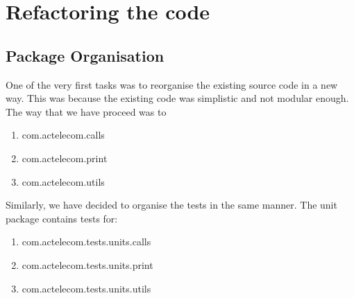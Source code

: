 \documentclass[11pt,twocolumn]{article} %
\begin{document}
\section{Refactoring the code}

\subsection{Package Organisation}
One of the very first tasks was to reorganise the existing source code in a new way.
This was because the existing code was simplistic and not modular enough. The way that
we have proceed was to 

\begin{enumerate}
 \item{com.actelecom.calls}
 \item{com.actelecom.print}
 \item{com.actelecom.utils}
\end{enumerate}

Similarly, we have decided to organise the tests in the same manner. The unit package contains tests for:
\begin{enumerate}
 \item{com.actelecom.tests.units.calls}
 \item{com.actelecom.tests.units.print}
 \item{com.actelecom.tests.units.utils}
\end{enumerate}

\end{document}
